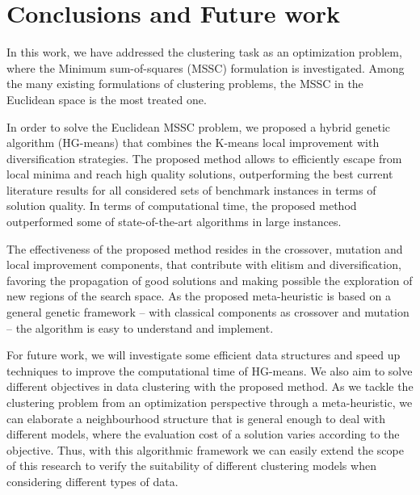 \chapter{Conclusions and Future work}

In this work, we have addressed the clustering task as an optimization problem, where the Minimum sum-of-squares (MSSC) formulation is investigated. Among the many existing formulations of clustering problems, the MSSC in the Euclidean space is the most treated one.

In order to solve the Euclidean MSSC problem, we proposed a hybrid genetic algorithm (HG-means) that combines the K-means local improvement with diversification strategies. The proposed method allows to efficiently escape from local minima and reach high quality solutions, outperforming the best current literature results for all considered sets of benchmark instances in terms of solution quality. In terms of computational time, the proposed method outperformed some of state-of-the-art algorithms in large instances.

The effectiveness of the proposed method resides in the crossover, mutation and local improvement components, that contribute with elitism and diversification, favoring the propagation of good solutions and making possible the exploration of new regions of the search space. As the proposed meta-heuristic is based on a general genetic framework -- with classical components as crossover and mutation -- the algorithm is easy to understand and implement.

For future work, we will investigate some efficient data structures and speed up techniques to improve the computational time of HG-means. We also aim to solve different objectives in data clustering with the proposed method. As we tackle the clustering problem from an optimization perspective through a meta-heuristic, we can elaborate a neighbourhood structure that is general enough to deal with different models, where the evaluation cost of a solution varies according to the objective. Thus, with this algorithmic framework we can easily extend the scope of this research to verify the suitability of different clustering models when considering different types of data.